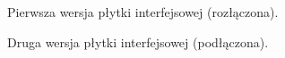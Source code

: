 \begin{figure}
 \centering
 \caption[Pierwsza wersja płytki interfejsowej]{Pierwsza wersja płytki interfejsowej (rozłączona).}
 \label{fig:first_interface}
\end{figure}

\begin{figure}
 \centering
 \caption[Druga wersja płytki interfejsowej]{Druga wersja płytki interfejsowej (podłączona).}
 \label{fig:second_interface}
\end{figure}

